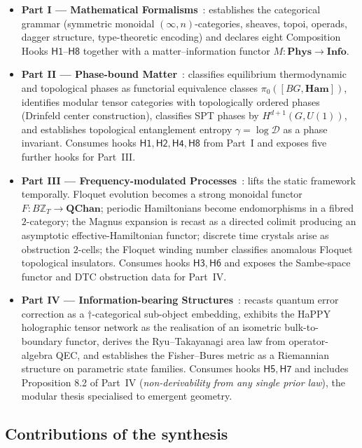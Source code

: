 \documentclass[12pt]{article}
\theoremstyle{definition}
\theoremstyle{remark}
\newcommand{\Phys}{\mathbf{Phys}}
\newcommand{\Info}{\mathbf{Info}}
\newcommand{\Ham}{\mathbf{Ham}}
\newcommand{\QChan}{\mathbf{QChan}}
\newcommand{\Z}{\mathbb{Z}}
\begin{document}
\begin{itemize}[leftmargin=2em]
  \item \textbf{Part I --- Mathematical Formalisms}~\cite{partI}: establishes
    the categorical grammar (symmetric monoidal $(\infty, n)$-categories,
    sheaves, topoi, operads, dagger structure, type-theoretic encoding) and
    declares eight Composition Hooks $\mathsf{H1}$--$\mathsf{H8}$ together with
    a matter--information functor $M : \Phys \to \Info$.
  \item \textbf{Part II --- Phase-bound Matter}~\cite{partII}: classifies
    equilibrium thermodynamic and topological phases as functorial equivalence
    classes $\pi_0([BG, \Ham])$, identifies modular tensor categories with
    topologically ordered phases (Drinfeld center construction), classifies SPT
    phases by $H^{d+1}(G, U(1))$, and establishes topological entanglement
    entropy $\gamma = \log \mathcal{D}$ as a phase invariant. Consumes hooks
    $\mathsf{H1}, \mathsf{H2}, \mathsf{H4}, \mathsf{H8}$ from Part~I and exposes
    five further hooks for Part~III.
  \item \textbf{Part III --- Frequency-modulated Processes}~\cite{partIII}:
    lifts the static framework temporally. Floquet evolution becomes a strong
    monoidal functor $F : B\Z_T \to \QChan$; periodic Hamiltonians become
    endomorphisms in a fibred $2$-category; the Magnus expansion is recast as
    a directed colimit producing an asymptotic effective-Hamiltonian functor;
    discrete time crystals arise as obstruction $2$-cells; the Floquet winding
    number classifies anomalous Floquet topological insulators. Consumes
    hooks $\mathsf{H3}, \mathsf{H6}$ and exposes the Sambe-space functor and
    DTC obstruction data for Part~IV.
  \item \textbf{Part IV --- Information-bearing Structures}~\cite{partIV}:
    recasts quantum error correction as a $\dagger$-categorical sub-object
    embedding, exhibits the HaPPY holographic tensor network as the
    realisation of an isometric bulk-to-boundary functor, derives the
    Ryu--Takayanagi area law from operator-algebra QEC, and establishes the
    Fisher--Bures metric as a Riemannian structure on parametric state
    families. Consumes hooks $\mathsf{H5}, \mathsf{H7}$ and includes
    Proposition 8.2 of Part~IV (\emph{non-derivability from any single prior
    law}), the modular thesis specialised to emergent geometry.
\end{itemize}

\subsection{Contributions of the synthesis}
\end{document}
